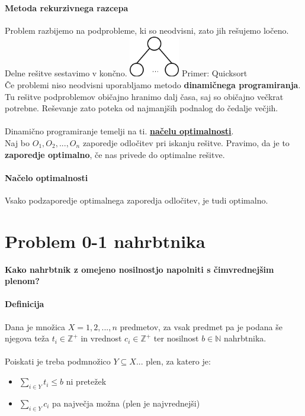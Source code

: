 \documentclass[a4paper,10pt]{article}
\begin{document}
\paragraph{Metoda rekurzivnega razcepa}
Problem razbijemo na podprobleme, ki so neodvisni, zato jih re\v sujemo lo\v ceno. Delne re\v sitve sestavimo v kon\v cno.
	\includegraphics[width=2.2cm,height=1.8cm]{Slike/DinProgUvod.png}
Primer: Quicksort\\
\v Ce problemi niso neodvisni uporabljamo metodo \textbf{dinami\v cnega programiranja}. Tu re\v sitve podproblemov obi\v cajno hranimo dalj \v casa, saj so obi\v cajno ve\v ckrat potrebne. Re\v sevanje zato poteka od najmanj\v sih podnalog do \v cedalje ve\v cjih.\\
\\
Dinami\v cno programiranje temelji na ti. \textbf{\underline{na\v celu optimalnosti}}.\\
Naj bo $O_1, O_2,..., O_n$ zaporedje odlo\v citev pri iskanju re\v sitve. Pravimo, da je to \textbf{zaporedje optimalno}, \v ce nas privede do optimalne re\v sitve.

\paragraph{Na\v celo optimalnosti}
Vsako podzaporedje optimalnega zaporedja odlo\v citev, je tudi optimalno.

\section{Problem 0-1 nahrbtnika}

\textbf{Kako nahrbtnik z omejeno nosilnostjo napolniti s \v cimvrednej\v sim plenom?}

\paragraph{Definicija}
Dana je mno\v zica $X={1, 2,..., n}$ predmetov, za vsak predmet pa je podana \v se njegova te\v za $t_i \in \mathbb{Z}^+$ in vrednost $c_i \in \mathbb{Z}^+$ ter nosilnost $b \in \mathbb{N}$ nahrbtnika.\\
\\
Poiskati je treba podmno\v zico $Y \subseteq X$... plen, za katero je:
\begin{itemize}
\item $\sum_{i \in Y}t_i \leq b$ ni prete\v zek
\item $\sum_{i \in Y}c_i$ pa najve\v cja mo\v zna (plen je najvrednej\v si)
\end{itemize}
\end{document}
